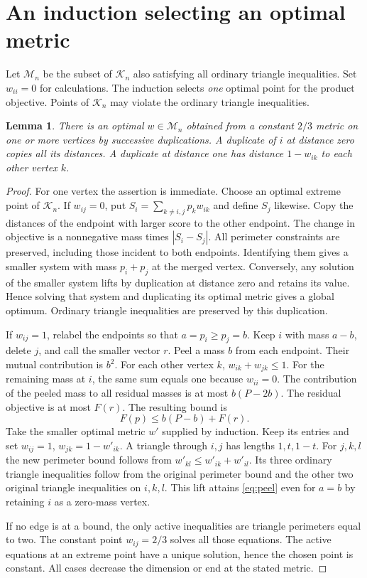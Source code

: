 \documentclass[11pt]{article}
\newtheorem{lemma}[theorem]{Lemma}
\newcommand{\K}{\mathcal K}
\newcommand{\M}{\mathcal M}
\begin{document}
\section{An induction selecting an optimal metric}
Let $\M_n$ be the subset of $\K_n$ also satisfying all ordinary triangle inequalities. Set $w_{ii}=0$ for calculations. The induction selects \emph{one} optimal point for the product objective. Points of $\K_n$ may violate the ordinary triangle inequalities.
\begin{lemma}\label{lem:induct}
There is an optimal $w\in\M_n$ obtained from a constant $2/3$ metric on one or more vertices by successive duplications. A duplicate of $i$ at distance zero copies all its distances. A duplicate at distance one has distance $1-w_{ik}$ to each other vertex $k$.
\end{lemma}
\begin{proof}
For one vertex the assertion is immediate. Choose an optimal extreme point of $\K_n$.
If $w_{ij}=0$, put $S_i=\sum_{k\ne i,j}p_k w_{ik}$ and define $S_j$ likewise. Copy the distances of the endpoint with larger score to the other endpoint. The change in objective is a nonnegative mass times $|S_i-S_j|$. All perimeter constraints are preserved, including those incident to both endpoints. Identifying them gives a smaller system with mass $p_i+p_j$ at the merged vertex. Conversely, any solution of the smaller system lifts by duplication at distance zero and retains its value. Hence solving that system and duplicating its optimal metric gives a global optimum. Ordinary triangle inequalities are preserved by this duplication.

If $w_{ij}=1$, relabel the endpoints so that $a=p_i\ge p_j=b$. Keep $i$ with mass $a-b$, delete $j$, and call the smaller vector $r$. Peel a mass $b$ from each endpoint. Their mutual contribution is $b^2$. For each other vertex $k$, $w_{ik}+w_{jk}\le1$. For the remaining mass at $i$, the same sum equals one because $w_{ii}=0$. The contribution of the peeled mass to all residual masses is at most $b(P-2b)$. The residual objective is at most $F(r)$. The resulting bound is
\begin{equation}\label{eq:peel}
 F(p)\le b(P-b)+F(r).
\end{equation}
Take the smaller optimal metric $w'$ supplied by induction. Keep its entries and set $w_{ij}=1$, $w_{jk}=1-w'_{ik}$. A triangle through $i,j$ has lengths $1,t,1-t$. For $j,k,l$ the new perimeter bound follows from $w'_{kl}\le w'_{ik}+w'_{il}$. Its three ordinary triangle inequalities follow from the original perimeter bound and the other two original triangle inequalities on $i,k,l$. This lift attains \eqref{eq:peel} even for $a=b$ by retaining $i$ as a zero-mass vertex.

If no edge is at a bound, the only active inequalities are triangle perimeters equal to two. The constant point $w_{ij}=2/3$ solves all those equations. The active equations at an extreme point have a unique solution, hence the chosen point is constant. All cases decrease the dimension or end at the stated metric.
\end{proof}
\end{document}
